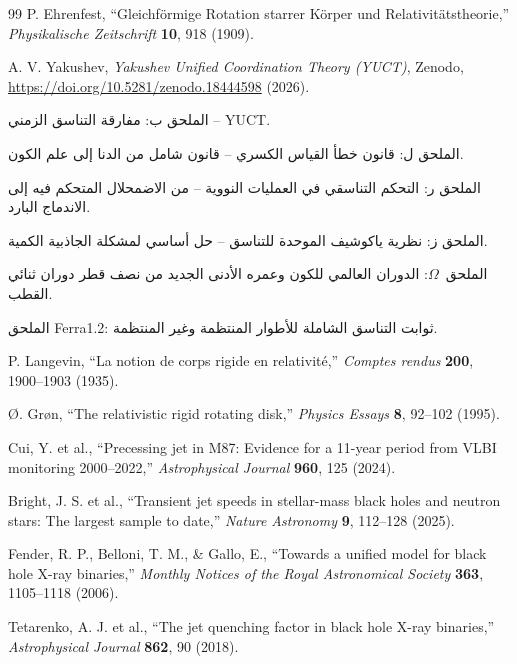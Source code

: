 \documentclass[12pt,a4paper]{article}
\begin{document}
	\begin{thebibliography}{99}
		P. Ehrenfest, ``Gleichf{\"o}rmige Rotation starrer K{\"o}rper und Relativit{\"a}tstheorie,'' \emph{Physikalische Zeitschrift} \textbf{10}, 918 (1909).
		
		A. V. Yakushev, \emph{Yakushev Unified Coordination Theory (YUCT)}, Zenodo, \url{https://doi.org/10.5281/zenodo.18444598} (2026).
		
		الملحق ب: مفارقة التناسق الزمني -- YUCT.
		
		الملحق ل: قانون خطأ القياس الكسري -- قانون شامل من الدنا إلى علم الكون.
		
		الملحق ر: التحكم التناسقي في العمليات النووية -- من الاضمحلال المتحكم فيه إلى الاندماج البارد.
		
		الملحق ز: نظرية ياكوشيف الموحدة للتناسق -- حل أساسي لمشكلة الجاذبية الكمية.
		
		الملحق~\(\Omega\): الدوران العالمي للكون وعمره الأدنى الجديد من نصف قطر دوران ثنائي القطب.
		
		الملحق Ferra1.2: ثوابت التناسق الشاملة للأطوار المنتظمة وغير المنتظمة.
		
		P. Langevin, ``La notion de corps rigide en relativit{\'e},'' \emph{Comptes rendus} \textbf{200}, 1900--1903 (1935).
		
		{\O}. Gr{\o}n, ``The relativistic rigid rotating disk,'' \emph{Physics Essays} \textbf{8}, 92--102 (1995).
		
		Cui, Y. et al., ``Precessing jet in M87: Evidence for a 11-year period from VLBI monitoring 2000–2022,'' \emph{Astrophysical Journal} \textbf{960}, 125 (2024).
		
		Bright, J. S. et al., ``Transient jet speeds in stellar-mass black holes and neutron stars: The largest sample to date,'' \emph{Nature Astronomy} \textbf{9}, 112–128 (2025).
		
		Fender, R. P., Belloni, T. M., \& Gallo, E., ``Towards a unified model for black hole X-ray binaries,'' \emph{Monthly Notices of the Royal Astronomical Society} \textbf{363}, 1105–1118 (2006).
		
		Tetarenko, A. J. et al., ``The jet quenching factor in black hole X-ray binaries,'' \emph{Astrophysical Journal} \textbf{862}, 90 (2018).
		

\end{thebibliography}
\end{document}
